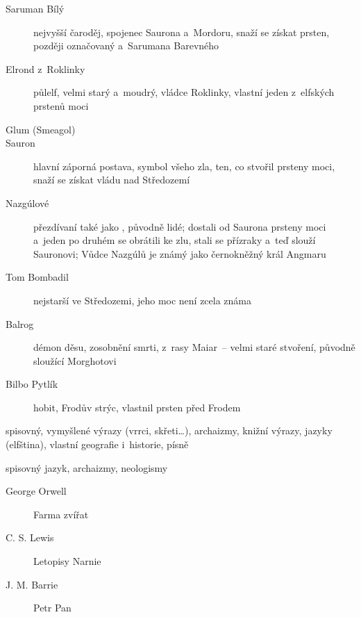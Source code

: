 {{\begin{description}
		\item[Saruman Bílý] nejvyšší čaroděj, spojenec Saurona a~Mordoru, snaží se
			získat prsten, později označovaný a~Sarumana Barevného
		\item[Elrond z Roklinky] půlelf, velmi starý a~moudrý, vládce Roklinky,
			vlastní jeden z elfských prstenů moci
		\item[Glum (Smeagol)]
		\item[Sauron] hlavní záporná postava, symbol všeho zla, ten, co stvořil
			prsteny moci, snaží se získat vládu nad Středozemí
		\item[Nazgúlové] přezdívaní také jako , původně lidé; dostali od
			Saurona prsteny moci a~jeden po druhém se obrátili ke zlu, stali se
			přízraky a~teď slouží Sauronovi; Vůdce Nazgúlů je známý jako černokněžný
			král Angmaru
		\item[Tom Bombadil] nejstarší  ve Středozemi, jeho moc není zcela
			známa
		\item[Balrog] démon děsu, zosobnění smrti, z rasy Maiar~-- velmi staré
			stvoření, původně sloužící Morghotovi
		\item[Bilbo Pytlík] hobit, Frodův strýc, vlastnil prsten před Frodem
	\end{description}
}

{spisovný, vymyšlené výrazy (vrrci, skřeti\dots), archaizmy, knižní výrazy,
jazyky (elfština), vlastní geografie i~historie, písně}


\newpart

{spisovný jazyk, archaizmy, neologismy}




\begin{description}
\item[George Orwell] Farma zvířat
\item[C. S. Lewis] Letopisy Narnie
\item[J. M. Barrie] Petr Pan
\end{description}
}

